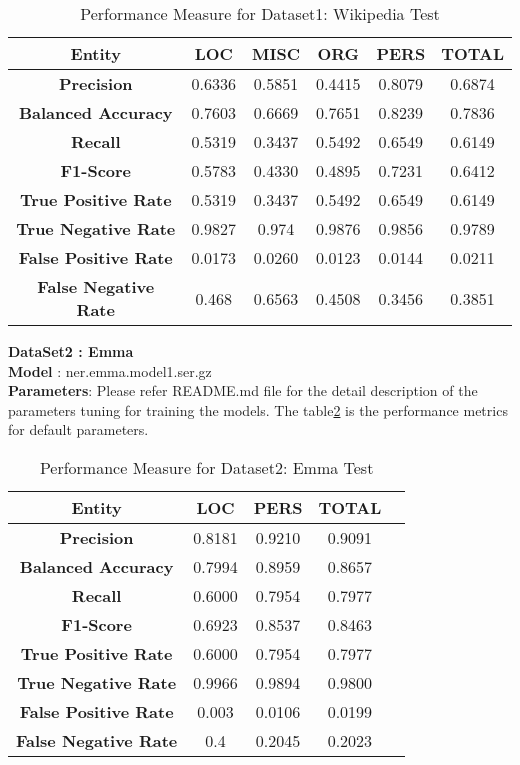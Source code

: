 \documentclass[12pt]{article}
\begin{document}
\begin{table}[h!]
\centering
\begin{tabular}{ |c|c|c|c|c|c|} 
\hline 
\textbf{Entity} & \textbf{LOC} & \textbf{MISC} & \textbf{ORG} & \textbf{PERS} & \textbf{TOTAL} \\ [2ex]
\hline 
\textbf{Precision} & 0.6336 & 0.5851 & 0.4415 & 0.8079 & 0.6874   \\ [1ex]
\hline 
\textbf{Balanced Accuracy} & 0.7603 & 0.6669 & 0.7651 & 0.8239 & 0.7836   \\ [1ex]
\hline
\textbf{Recall} & 0.5319 & 0.3437 & 0.5492 & 0.6549 & 0.6149   \\  [1ex]
\hline
\textbf{F1-Score} & 0.5783 & 0.4330 & 0.4895 & 0.7231 & 0.6412   \\ [1ex]
\hline
\textbf{True Positive Rate} & 0.5319 & 0.3437 & 0.5492 & 0.6549 & 0.6149 \\  [1ex]
\hline
\textbf{True Negative Rate} & 0.9827 & 0.974 & 0.9876 & 0.9856 & 0.9789   \\ [1ex]
\hline
\textbf{False Positive Rate} & 0.0173 & 0.0260 & 0.0123 & 0.0144 & 0.0211 \\ [1ex]
\hline
\textbf{False Negative Rate} & 0.468 & 0.6563 & 0.4508 & 0.3456 & 0.3851  \\ [1ex]

\hline
\end{tabular}
\caption{Performance Measure for Dataset1: Wikipedia Test}
\label{table:1}
\end{table}
\textbf{DataSet2 : Emma}\\
\textbf{Model} : ner.emma.model1.ser.gz\\
\textbf{Parameters}: Please refer README.md file for the detail description of the  parameters tuning for training the models. The table\ref{table:2} is the performance metrics for default parameters. \\


\begin{table}[h!]
\centering
\begin{tabular}{ |c|c|c|c|c|} 
\hline 
\textbf{Entity} & \textbf{LOC} & \textbf{PERS} & \textbf{TOTAL} \\ [2ex]
\hline 
\textbf{Precision} & 0.8181 & 0.9210 & 0.9091 \\ [1ex]
\hline 
\textbf{Balanced Accuracy} & 0.7994 & 0.8959 & 0.8657 \\ [1ex]
\hline
\textbf{Recall} & 0.6000 & 0.7954 & 0.7977  \\  [1ex]
\hline
\textbf{F1-Score} & 0.6923 & 0.8537 & 0.8463 \\ [1ex]
\hline
\textbf{True Positive Rate} & 0.6000 & 0.7954 & 0.7977 \\  [1ex]
\hline
\textbf{True Negative Rate} & 0.9966 & 0.9894 & 0.9800   \\ [1ex]
\hline
\textbf{False Positive Rate} & 0.003 & 0.0106 & 0.0199 \\ [1ex]
\hline
\textbf{False Negative Rate} & 0.4 & 0.2045 & 0.2023 \\ [1ex]

\hline
\end{tabular}
\caption{Performance Measure for Dataset2: Emma Test}
\label{table:2}
\end{table}
\end{document}
